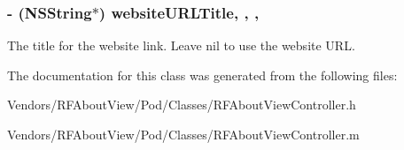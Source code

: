 \subsubsection[{website\+U\+R\+L\+Title}]{\setlength{\rightskip}{0pt plus 5cm}-\/ (N\+S\+String$\ast$) website\+U\+R\+L\+Title\hspace{0.3cm}{\ttfamily [read]}, {\ttfamily [write]}, {\ttfamily [nonatomic]}, {\ttfamily [strong]}}\label{interface_r_f_about_view_controller_a09a97ea3299148bec27c9c2b550b8939}
The title for the website link. Leave nil to use the website U\+R\+L. 

The documentation for this class was generated from the following files\+:\begin{DoxyCompactItemize}
\item 
Vendors/\+R\+F\+About\+View/\+Pod/\+Classes/R\+F\+About\+View\+Controller.\+h\item 
Vendors/\+R\+F\+About\+View/\+Pod/\+Classes/R\+F\+About\+View\+Controller.\+m\end{DoxyCompactItemize}
